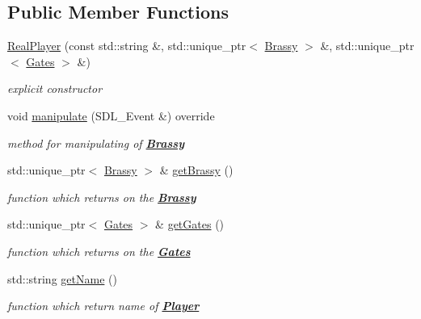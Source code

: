 \subsection*{Public Member Functions}
\begin{DoxyCompactItemize}
\item 
\mbox{\label{class_real_player_a1fe9cc34fc464e567308f3750cc16ed7}} 
\mbox{\hyperlink{class_real_player_a1fe9cc34fc464e567308f3750cc16ed7}{Real\+Player}} (const std\+::string \&, std\+::unique\+\_\+ptr$<$ \mbox{\hyperlink{class_brassy}{Brassy}} $>$ \&, std\+::unique\+\_\+ptr$<$ \mbox{\hyperlink{class_gates}{Gates}} $>$ \&)
\begin{DoxyCompactList}\small\item\em explicit {\itshape constructor} \end{DoxyCompactList}\item 
\mbox{\label{class_real_player_a275cce8ef7bad48639f8b092fd7f21c0}} 
void \mbox{\hyperlink{class_real_player_a275cce8ef7bad48639f8b092fd7f21c0}{manipulate}} (S\+D\+L\+\_\+\+Event \&) override
\begin{DoxyCompactList}\small\item\em {\itshape method} for manipulating of {\bfseries{\mbox{\hyperlink{class_brassy}{Brassy}}}} \end{DoxyCompactList}\item 
\mbox{\label{class_real_player_a728b72ad405c516ff20b86c6f5527c5d}} 
std\+::unique\+\_\+ptr$<$ \mbox{\hyperlink{class_brassy}{Brassy}} $>$ \& \mbox{\hyperlink{class_real_player_a728b72ad405c516ff20b86c6f5527c5d}{get\+Brassy}} ()
\begin{DoxyCompactList}\small\item\em {\itshape function} which returns {\itshape on} the {\bfseries{\mbox{\hyperlink{class_brassy}{Brassy}}}} \end{DoxyCompactList}\item 
\mbox{\label{class_real_player_a4b4f41043c56aaf6b91e61579fa15735}} 
std\+::unique\+\_\+ptr$<$ \mbox{\hyperlink{class_gates}{Gates}} $>$ \& \mbox{\hyperlink{class_real_player_a4b4f41043c56aaf6b91e61579fa15735}{get\+Gates}} ()
\begin{DoxyCompactList}\small\item\em {\itshape function} which returns {\itshape on} the {\bfseries{\mbox{\hyperlink{class_gates}{Gates}}}} \end{DoxyCompactList}\item 
\mbox{\label{class_real_player_a75cdce0a46626ff820727d3f52fb9df8}} 
std\+::string \mbox{\hyperlink{class_real_player_a75cdce0a46626ff820727d3f52fb9df8}{get\+Name}} ()
\begin{DoxyCompactList}\small\item\em {\itshape function} which return {\itshape name} of {\bfseries{\mbox{\hyperlink{class_player}{Player}}}} \end{DoxyCompactList}\end{DoxyCompactItemize}
